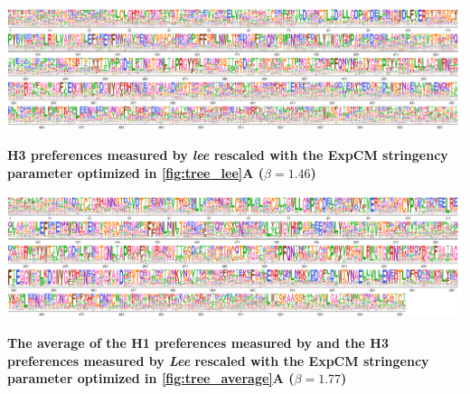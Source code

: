 \documentclass[11pt]{article}
\begin{document}
\begin{suppfig}[H]
\centerline{\includegraphics[width=\textwidth]{figures/prefs_lee}}
\caption{\label{suppfig:prefs_lee}
\textbf{H3 preferences measured by \textit{lee} rescaled with the ExpCM stringency parameter optimized in \ref{fig:tree_lee}A  ($\beta = 1.46$)}
 }
\end{suppfig}

\begin{suppfig}[H]
\centerline{\includegraphics[width=\textwidth]{figures/prefs_average}}
\caption{\label{fig:prefs_average}
\textbf{The average of the H1 preferences measured by \cite{doud2016accurate} and the H3 preferences measured by \textit{Lee} rescaled with the ExpCM stringency parameter optimized in \ref{fig:tree_average}A  ($\beta = 1.77$)}}
\end{suppfig}
 
\end{document}
